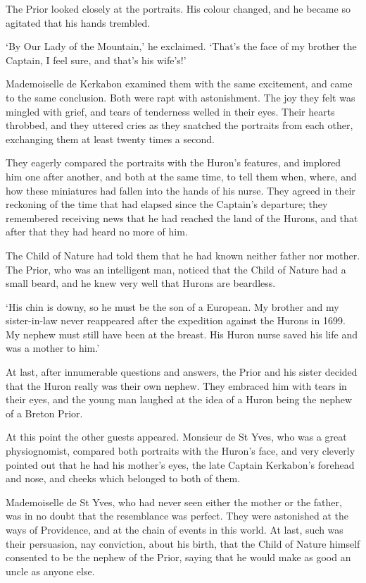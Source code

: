 \documentclass{article}
\begin{document}
\begin{center}
The Prior looked closely at the portraits. His colour changed, and he became so 
agitated that his hands trembled. 

`By Our Lady of the Mountain,' he exclaimed. `That's the face of my brother the 
Captain, I feel sure, and that's his wife's!' 

Mademoiselle de Kerkabon examined them with the same excitement, and came to the 
same conclusion. Both were rapt with astonishment. The joy they felt was mingled 
with grief, and tears of tenderness welled in their eyes. Their hearts throbbed, 
and they uttered cries as they snatched the portraits from each other, exchanging 
them at least twenty times a second. 

They eagerly compared the portraits with the Huron's features, and implored him 
one after another, and both at the same time, to tell them when, where, and how 
these miniatures had fallen into the hands of his nurse. They agreed in their reckoning 
of the time that had elapsed since the Captain's departure; they remembered receiving 
news that he had reached the land of the Hurons, and that after that they had heard 
no more of him. 

The Child of Nature had told them that he had known neither father nor mother. 
The Prior, who was an intelligent man, noticed that the Child of Nature had a small 
beard, and he knew very well that Hurons are beardless. 

`His chin is downy, so he must be the son of a European. My brother and my sister-in-law 
never reappeared after the expedition against the Hurons in 1699. My nephew must 
still have been at the breast. His Huron nurse saved his life and was a mother 
to him.' 

At last, after innumerable questions and answers, the Prior and his sister decided 
that the Huron really was their own nephew. They embraced him with tears in their 
eyes, and the young man laughed at the idea of a Huron being the nephew of a Breton 
Prior. 

At this point the other guests appeared. Monsieur de St Yves, who was a great physiognomist, 
compared both portraits with the Huron's face, and very cleverly pointed out that 
he had his mother's eyes, the late Captain Kerkabon's forehead and nose, and cheeks 
which belonged to both of them. 

Mademoiselle de St Yves, who had never seen either the mother or the father, was 
in no doubt that the resemblance was perfect. They were astonished at the ways 
of Providence, and at the chain of events in this world. At last, such was their 
persuasion, nay conviction, about his birth, that the Child of Nature himself consented 
to be the nephew of the Prior, saying that he would make as good an uncle as anyone 
else. 


\end{center}
\end{document}
